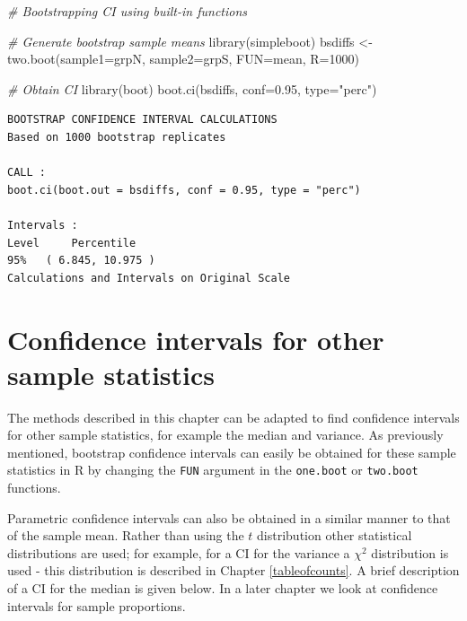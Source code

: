 \documentclass[
  oneside]{krantz}
\newenvironment{Shaded}{\begin{snugshade}}{\end{snugshade}}
\newcommand{\AttributeTok}[1]{\textcolor[rgb]{0.77,0.63,0.00}{#1}}
\newcommand{\CommentTok}[1]{\textcolor[rgb]{0.56,0.35,0.01}{\textit{#1}}}
\newcommand{\DecValTok}[1]{\textcolor[rgb]{0.00,0.00,0.81}{#1}}
\newcommand{\FloatTok}[1]{\textcolor[rgb]{0.00,0.00,0.81}{#1}}
\newcommand{\FunctionTok}[1]{\textcolor[rgb]{0.00,0.00,0.00}{#1}}
\newcommand{\NormalTok}[1]{#1}
\newcommand{\OtherTok}[1]{\textcolor[rgb]{0.56,0.35,0.01}{#1}}
\newcommand{\StringTok}[1]{\textcolor[rgb]{0.31,0.60,0.02}{#1}}
\begin{document}
\begin{Shaded}
\begin{Highlighting}[]
\CommentTok{\# Bootstrapping CI using built{-}in functions}

\CommentTok{\# Generate bootstrap sample means}
\FunctionTok{library}\NormalTok{(simpleboot)}
\NormalTok{bsdiffs }\OtherTok{\textless{}{-}} \FunctionTok{two.boot}\NormalTok{(}\AttributeTok{sample1=}\NormalTok{grpN, }\AttributeTok{sample2=}\NormalTok{grpS, }\AttributeTok{FUN=}\NormalTok{mean, }\AttributeTok{R=}\DecValTok{1000}\NormalTok{)}

\CommentTok{\# Obtain CI}
\FunctionTok{library}\NormalTok{(boot)}
\FunctionTok{boot.ci}\NormalTok{(bsdiffs, }\AttributeTok{conf=}\FloatTok{0.95}\NormalTok{, }\AttributeTok{type=}\StringTok{"perc"}\NormalTok{) }
\end{Highlighting}
\end{Shaded}

\begin{verbatim}
BOOTSTRAP CONFIDENCE INTERVAL CALCULATIONS
Based on 1000 bootstrap replicates

CALL : 
boot.ci(boot.out = bsdiffs, conf = 0.95, type = "perc")

Intervals : 
Level     Percentile     
95%   ( 6.845, 10.975 )  
Calculations and Intervals on Original Scale
\end{verbatim}

\hypertarget{confidence-intervals-for-other-sample-statistics}{%
\section{Confidence intervals for other sample statistics}\label{confidence-intervals-for-other-sample-statistics}}

The methods described in this chapter can be adapted to find confidence intervals for other sample statistics, for example the median and variance. As previously mentioned, bootstrap confidence intervals can easily be obtained for these sample statistics in R by changing the \texttt{FUN} argument in the \texttt{one.boot} or \texttt{two.boot} functions.

Parametric confidence intervals can also be obtained in a similar manner to that of the sample mean. Rather than using the \(t\) distribution other statistical distributions are used; for example, for a CI for the variance a \(\chi^2\) distribution is used - this distribution is described in Chapter \ref{tableofcounts}.
A brief description of a CI for the median is given below. In a later chapter we look at confidence intervals for sample proportions.
\end{document}
